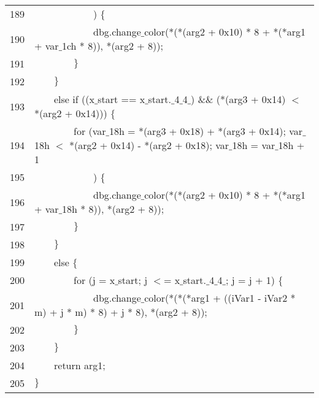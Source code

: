 \documentclass{report}
\newcommand{\tab}{$\quad$}
\newcommand{\csfont}[1]{\fontfamily{cmtt}\selectfont #1}
\begin{document}
\begin{tabular}{c|l}
  189 & {\csfont{\tab \tab \tab \tab \tab \tab ) $\{$}} \\
  190 & {\csfont{\tab \tab \tab \tab \tab \tab dbg.change$\_$color(*(*(arg2 + 0x10) * 8 + *(*arg1 + var$\_$1ch * 8)), *(arg2 + 8));}} \\
  191 & {\csfont{\tab \tab \tab \tab $\}$}} \\
  192 & {\csfont{\tab \tab $\}$}} \\
  193 & {\csfont{\tab \tab else if ((x$\_$start == x$\_$start.$\_$4$\_$4$\_$) $\&$$\&$ (*(arg3 + 0x14) $<$ *(arg2 + 0x14))) $\{$}} \\
  194 & {\csfont{\tab \tab \tab \tab for (var$\_$18h = *(arg3 + 0x18) + *(arg3 + 0x14); var$\_$18h $<$ *(arg2 + 0x14) - *(arg2 + 0x18); var$\_$18h = var$\_$18h + 1}} \\
  195 & {\csfont{\tab \tab \tab \tab \tab \tab ) $\{$}} \\
  196 & {\csfont{\tab \tab \tab \tab \tab \tab dbg.change$\_$color(*(*(arg2 + 0x10) * 8 + *(*arg1 + var$\_$18h * 8)), *(arg2 + 8));}} \\
  197 & {\csfont{\tab \tab \tab \tab $\}$}} \\
  198 & {\csfont{\tab \tab $\}$}} \\
  199 & {\csfont{\tab \tab else $\{$}} \\
  200 & {\csfont{\tab \tab \tab \tab for (j = x$\_$start; j $<$= x$\_$start.$\_$4$\_$4$\_$; j = j + 1) $\{$}} \\
  201 & {\csfont{\tab \tab \tab \tab \tab \tab dbg.change$\_$color(*(*(*arg1 + ((iVar1 - iVar2 * m) + j * m) * 8) + j * 8), *(arg2 + 8));}} \\
  202 & {\csfont{\tab \tab \tab \tab $\}$}} \\
  203 & {\csfont{\tab \tab $\}$}} \\
  204 & {\csfont{\tab \tab return arg1;}} \\
  205 & {\csfont{$\}$}} \\
\hline\end{tabular}
\end{document}
